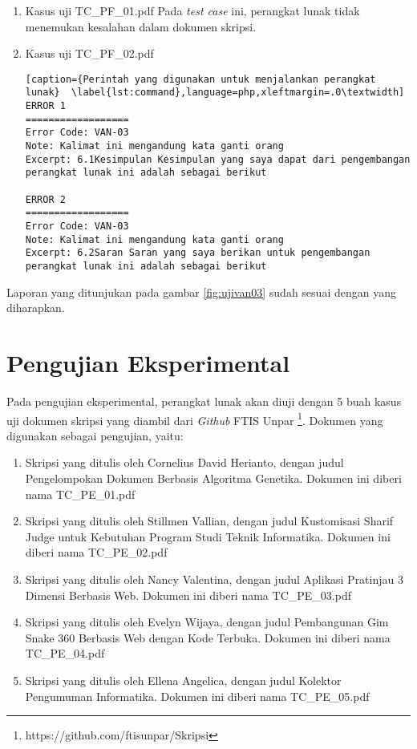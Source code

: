 \begin{enumerate}
	\item Kasus uji TC\_PF\_01.pdf
	Pada \textit{test case} ini, perangkat lunak tidak menemukan kesalahan dalam dokumen skripsi.
	
	\item Kasus uji TC\_PF\_02.pdf
	
\begin{lstlisting}[caption={Perintah yang digunakan untuk menjalankan perangkat lunak}	\label{lst:command},language=php,xleftmargin=.0\textwidth]
ERROR 1
==================
Error Code: VAN-03
Note: Kalimat ini mengandung kata ganti orang
Excerpt: 6.1Kesimpulan Kesimpulan yang saya dapat dari pengembangan perangkat lunak ini adalah sebagai berikut

ERROR 2
==================
Error Code: VAN-03
Note: Kalimat ini mengandung kata ganti orang
Excerpt: 6.2Saran Saran yang saya berikan untuk pengembangan perangkat lunak ini adalah sebagai berikut
\end{lstlisting}
\end{enumerate}

Laporan yang ditunjukan pada gambar \ref{fig:ujivan03} sudah sesuai dengan yang diharapkan.

\section{Pengujian Eksperimental}
Pada pengujian eksperimental, perangkat lunak akan diuji dengan 5 buah kasus uji dokumen skripsi yang diambil dari \textit{Github} FTIS Unpar \footnote{https://github.com/ftisunpar/Skripsi}. Dokumen yang digunakan sebagai pengujian, yaitu:

\begin{enumerate}
	\item Skripsi yang ditulis oleh Cornelius David Herianto, dengan judul Pengelompokan Dokumen Berbasis Algoritma Genetika. Dokumen ini diberi nama TC\_PE\_01.pdf~\cite{pe01}
	
	\item Skripsi yang ditulis oleh Stillmen Vallian, dengan judul Kustomisasi Sharif Judge untuk Kebutuhan Program Studi Teknik Informatika. Dokumen ini diberi nama TC\_PE\_02.pdf~\cite{pe02}
	
	\item Skripsi yang ditulis oleh Nancy Valentina, dengan judul Aplikasi Pratinjau 3 Dimensi Berbasis Web. Dokumen ini diberi nama TC\_PE\_03.pdf~\cite{pe03}
	
	\item Skripsi yang ditulis oleh Evelyn Wijaya, dengan judul Pembangunan Gim Snake 360 Berbasis Web dengan Kode Terbuka. Dokumen ini diberi nama TC\_PE\_04.pdf~\cite{pe04}
	
	\item Skripsi yang ditulis oleh Ellena Angelica, dengan judul Kolektor Pengumuman Informatika. Dokumen ini diberi nama TC\_PE\_05.pdf~\cite{pe05} 
	
\end{enumerate}

